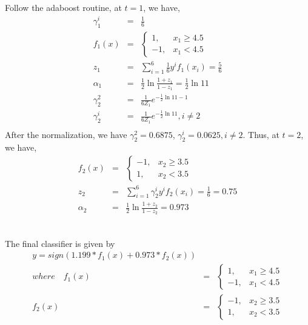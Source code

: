 \documentclass[12pt]{article}
\begin{document}
\subsection{}
Follow the adaboost routine, at $t = 1$, we have,
\begin{eqnarray}
    \gamma_1^{i} &=& \frac{1}{6} \nonumber \\
    f_1(x) &=& \begin{cases}
        1, & x_1 \ge 4.5 \\
        -1, & x_1 < 4.5
        \end{cases} \nonumber \\
    z_1 &=& \sum_{i = 1}^{6} \frac{1}{6} y^{i} f_1(x_i) = \frac{5}{6} \nonumber \\
    \alpha_1 &=& \frac{1}{2}\ln\frac{1 + z_1}{1 - z_1} = \frac{1}{2}\ln 11 \nonumber \\
    \gamma_2^2 &=& \frac{1}{6 Z _1}e^{-\frac{1}{2}\ln 11 -1} \nonumber \\
    \gamma_2^i &=& \frac{1}{6 Z _1}e^{-\frac{1}{2}\ln 11 }, i \ne 2 \nonumber \\
\end{eqnarray}
After the normalization, we have $\gamma_2^2 = 0.6875$, $\gamma_2^i = 0.0625, i \ne 2$. Thus, at $t = 2$, we have,
\begin{eqnarray}
    f_2(x) &=& \begin{cases}
        -1, & x_2 \ge 3.5 \\
        1, & x_2 < 3.5
        \end{cases} \nonumber \\
    z_2 &=& \sum_{i = 1}^{6} \gamma_2^i y^{i} f_2(x_i) = \frac{1}{6} = 0.75 \nonumber \\
    \alpha_2 &=& \frac{1}{2}\ln\frac{1 + z_2}{1 - z_2} = 0.973 \nonumber \\
\end{eqnarray}

\subsection{}
The final classifier is given by
\begin{eqnarray}
    y = sign(1.199 * f_1(x) + 0.973 * f_2(x)) \nonumber \\
    where \quad f_1(x) &=& \begin{cases}
        1, & x_1 \ge 4.5 \\
        -1, & x_1 < 4.5
        \end{cases} \nonumber \\
    f_2(x) &=& \begin{cases}
        -1, & x_2 \ge 3.5 \\
        1, & x_2 < 3.5
        \end{cases} \nonumber
\end{eqnarray}
\newpage
\end{document}
